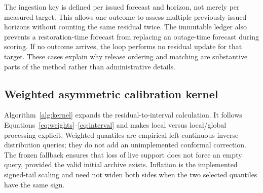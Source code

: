 The ingestion key is defined per issued forecast and horizon, not merely per measured target. This allows one outcome to assess multiple previously issued horizons without counting the same residual twice. The immutable ledger also prevents a restoration-time forecast from replacing an outage-time forecast during scoring. If no outcome arrives, the loop performs no residual update for that target. These cases explain why release ordering and matching are substantive parts of the method rather than administrative details.

\subsection{Weighted asymmetric calibration kernel}
Algorithm~\ref{alg:kernel} expands the residual-to-interval calculation. It follows Equations~\eqref{eq:weights}--\eqref{eq:interval} and makes local versus local/global processing explicit. Weighted quantiles are empirical left-continuous inverse-distribution queries; they do not add an unimplemented conformal correction. The frozen fallback ensures that loss of live support does not force an empty query, provided the valid initial archive exists. Inflation is the implemented signed-tail scaling and need not widen both sides when the two selected quantiles have the same sign.

